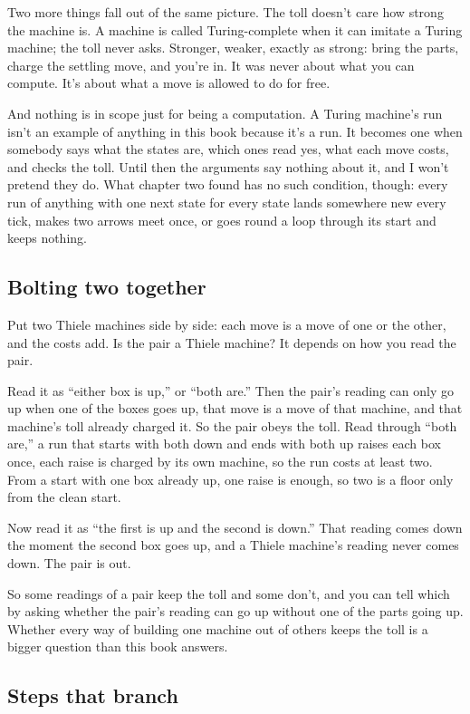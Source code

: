 \documentclass[11pt,twoside]{article}
\theoremstyle{thielethm}
\theoremstyle{thieledef}
\theoremstyle{thieledef}
\theoremstyle{thieledef}
\theoremstyle{thielethm}
\theoremstyle{thieleobs}
\theoremstyle{thielethm}
\begin{document}
Two more things fall out of the same picture. The toll doesn't care how strong the machine is. A machine is called Turing-complete when it can imitate a Turing machine; the toll never asks. Stronger, weaker, exactly as strong: bring the parts, charge the settling move, and you're in. It was never about what you can compute. It's about what a move is allowed to do for free.

And nothing is in scope just for being a computation. A Turing machine's run isn't an example of anything in this book because it's a run. It becomes one when somebody says what the states are, which ones read yes, what each move costs, and checks the toll. Until then the arguments say nothing about it, and I won't pretend they do. What chapter two found has no such condition, though: every run of anything with one next state for every state lands somewhere new every tick, makes two arrows meet once, or goes round a loop through its start and keeps nothing.

\subsection{Bolting two together}

Put two Thiele machines side by side: each move is a move of one or the other, and the costs add. Is the pair a Thiele machine? It depends on how you read the pair.

Read it as ``either box is up,'' or ``both are.'' Then the pair's reading can only go up when one of the boxes goes up, that move is a move of that machine, and that machine's toll already charged it. So the pair obeys the toll. Read through ``both are,'' a run that starts with both down and ends with both up raises each box once, each raise is charged by its own machine, so the run costs at least two. From a start with one box already up, one raise is enough, so two is a floor only from the clean start.

Now read it as ``the first is up and the second is down.'' That reading comes down the moment the second box goes up, and a Thiele machine's reading never comes down. The pair is out.

So some readings of a pair keep the toll and some don't, and you can tell which by asking whether the pair's reading can go up without one of the parts going up. Whether every way of building one machine out of others keeps the toll is a bigger question than this book answers.

\subsection{Steps that branch}
\end{document}
